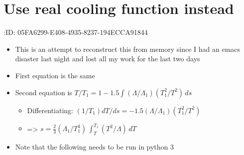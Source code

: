 \documentclass[11pt]{article}
\begin{document}
\section{Use real cooling function instead}
\label{sec:orgheadline2}
:ID:       05FA6299-E408-4935-8237-194ECCA91844
\begin{itemize}
\item This is an attempt to reconstruct this from memory since I had an emacs disaster last night and lost all my work for the last two days
\item First equation is the same
\item Second equation is \(T / T_{1} = 1 - 1.5 \int (\Lambda / \Lambda_{1})(T_{1}^{2}/T^{2})\, ds\)
\begin{itemize}
\item Differentiating: \((1/T_{1}) dT/ds = -1.5 (\Lambda / \Lambda_{1})(T_{1}^{2}/T^{2})\)
\item => \(s = \frac23 (\Lambda_{1}/T_{1}^{3}) \, \int_{T}^{T_{1}} (T^{2} / \Lambda) \, dT\)
\end{itemize}
\item Note that the following needs to be run in python 3
\end{itemize}
\end{document}
